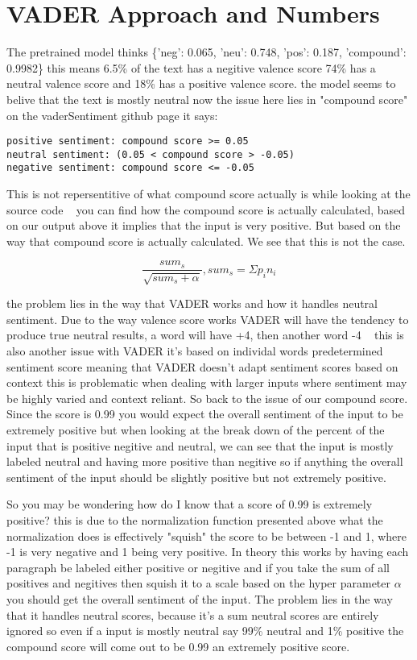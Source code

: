 \documentclass[12pt]{article}
\begin{document}
\newpage
\section{VADER Approach and Numbers}
The pretrained model thinks \{'neg': 0.065, 'neu': 0.748, 'pos': 0.187, 'compound': 0.9982\}
this means 6.5\% of the text has a negitive valence
score 74\% has a neutral valence score and 18\% has a positive
valence score.
the model seems to belive that the text is mostly neutral
now the issue here lies in "compound score"
on the vaderSentiment github page it says:
\begin{verbatim}
positive sentiment: compound score >= 0.05
neutral sentiment: (0.05 < compound score > -0.05) 
negative sentiment: compound score <= -0.05
\end{verbatim}
This is not repersentitive of what compound score actually is while looking
at the source code ~\cite{vadercode}
you can find how the compound score is actually calculated, based on our
output above it implies that the input is very positive. But based on 
the way that compound score is actually calculated. We see that this is
not the case.

$$
\frac{sum_s}{\sqrt{sum_s+\alpha}}, sum_s = \Sigma{}p_i n_i
$$

the problem lies in the way that VADER works and how it handles neutral
sentiment. Due to the way valence score works VADER will have the tendency
to produce true neutral results, a word will have +4, then another word -4 ~\cite{vadercode}
this is also another issue with VADER it's based on individal words predetermined
sentiment score meaning that VADER doesn't adapt sentiment scores based on context
this is problematic when dealing with larger inputs where sentiment may be highly varied
and context reliant. So back to the issue of our compound score.
Since the score is 0.99 you would expect the overall sentiment of the input to be
extremely positive but when looking at the break down of the percent of the input
that is positive negitive and neutral, we can see that the input is mostly
labeled neutral and having more positive than negitive so if anything the overall
sentiment of the input should be slightly positive but not extremely positive.

So you may be wondering how do I know that a score of 0.99 is extremely positive?
this is due to the normalization function presented above what the normalization
does is effectively "squish" the score to be between -1 and 1, where -1 is very 
negative and 1 being very positive. In theory this works by having each paragraph
be labeled either positive or negitive and if you take the sum of all positives and
negitives then squish it to a scale based on the hyper parameter $\alpha$ you
should get the overall sentiment of the input. The problem lies in the way that it
handles neutral scores, because it's a sum neutral scores are entirely ignored
so even if a input is mostly neutral say 99\% neutral and 1\% positive the compound
score will come out to be 0.99 an extremely positive score. 
\end{document}
